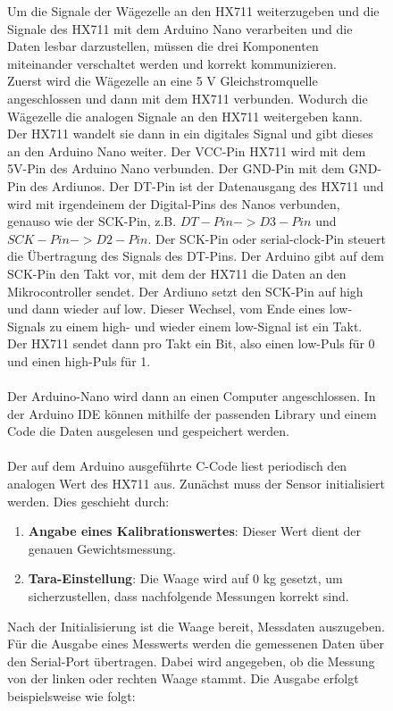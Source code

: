 \begin{figure}
Um die Signale der Wägezelle an den HX711 weiterzugeben und die Signale des HX711 mit dem Arduino Nano verarbeiten und die Daten lesbar darzustellen, müssen die drei Komponenten miteinander verschaltet werden und korrekt kommunizieren. \\
Zuerst wird die Wägezelle an eine 5 V Gleichstromquelle angeschlossen und dann mit dem HX711 verbunden. Wodurch die Wägezelle die analogen Signale an den HX711 weitergeben kann. Der HX711 wandelt sie dann in ein digitales Signal und gibt dieses an den Arduino Nano weiter. Der VCC-Pin HX711 wird mit dem 5V-Pin des Arduino Nano verbunden. Der GND-Pin mit dem GND-Pin des Ardiunos. Der DT-Pin ist der Datenausgang des HX711 und wird mit irgendeinem der Digital-Pins des Nanos verbunden, genauso wie der SCK-Pin, z.B. $DT-Pin -> D3-Pin$ und $SCK-Pin -> D2-Pin$. Der SCK-Pin oder serial-clock-Pin steuert die Übertragung des Signals des DT-Pins. Der Arduino gibt auf dem SCK-Pin den Takt vor, mit dem der HX711 die Daten an den Mikrocontroller sendet. Der Ardiuno setzt den SCK-Pin auf high und dann wieder auf low. Dieser Wechsel, vom Ende eines low-Signals zu einem high- und wieder einem low-Signal ist ein Takt. Der HX711 sendet dann pro Takt ein Bit, also einen low-Puls für 0 und einen high-Puls für 1. \\
\\
Der Arduino-Nano wird dann an einen Computer angeschlossen.
In der Arduino IDE können mithilfe der passenden Library und einem Code die Daten ausgelesen und gespeichert werden.
\\
\\
Der auf dem Arduino ausgeführte C-Code liest periodisch den analogen Wert des HX711 aus. Zunächst muss der Sensor initialisiert werden. Dies geschieht durch:
\begin{enumerate}
    \item \textbf{Angabe eines Kalibrationswertes}: Dieser Wert dient der genauen Gewichtsmessung.
    \item \textbf{Tara-Einstellung}: Die Waage wird auf 0 kg gesetzt, um sicherzustellen, dass nachfolgende Messungen korrekt sind.
\end{enumerate}
Nach der Initialisierung ist die Waage bereit, Messdaten auszugeben.
\\
Für die Ausgabe eines Messwerts werden die gemessenen Daten über den Serial-Port übertragen.
Dabei wird angegeben, ob die Messung von der linken oder rechten Waage stammt.
Die Ausgabe erfolgt beispielsweise wie folgt:
\begin{center}

\end{center}
\end{figure}
